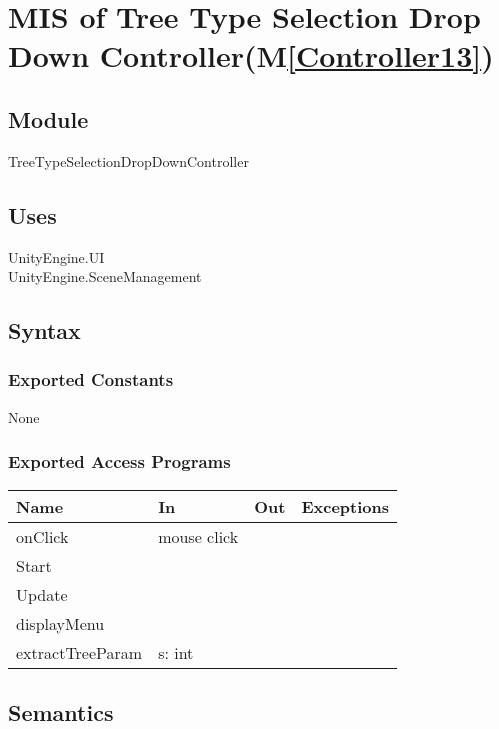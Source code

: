 \documentclass[12pt, titlepage]{article}
\newcommand{\mref}[1]{M\ref{#1}}
\begin{document}

\newpage

\section{MIS of Tree Type Selection Drop Down Controller(\mref{Controller13})} 

\subsection{Module}

TreeTypeSelectionDropDownController

\subsection{Uses}
UnityEngine.UI\\
UnityEngine.SceneManagement\\

\subsection{Syntax}

\subsubsection{Exported Constants}
None
\subsubsection{Exported Access Programs}

\begin{center}
\begin{tabular}{| l | l | l | p{5cm}|}
\hline
\textbf{Name} & \textbf{In} & \textbf{Out} & \textbf{Exceptions} \\
\hline
onClick & mouse click  &   & \\
\hline
Start &&&\\
\hline
Update &&&\\
\hline
displayMenu &&&\\
\hline
extractTreeParam & s: int &  &  \\
\hline
\end{tabular}
\end{center}

\subsection{Semantics}
\end{document}
